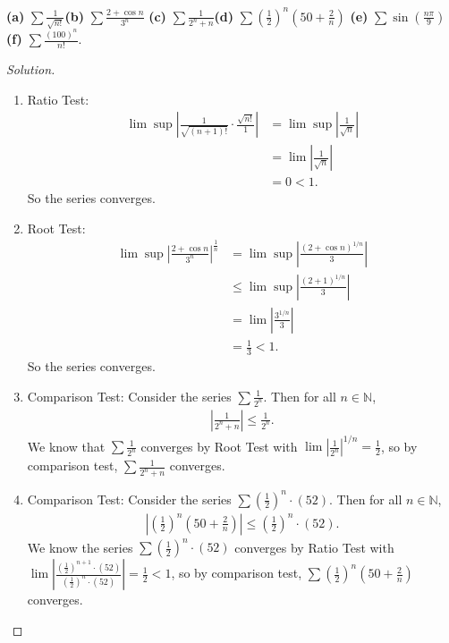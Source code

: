 \documentclass{article}
\begin{document}
\noindent \textbf{(a)} $\sum\frac{1}{\sqrt{n!}}$\quad \textbf{(b)} $\sum\frac{2+\cos n}{3^n}$
\quad \textbf{(c)} $\sum\frac{1}{2^n+n}$\quad \textbf{(d)} $\sum\left(\frac{1}{2}\right)^n
\left(50+\frac{2}{n}\right)$ \quad \textbf{(e)} $\sum\sin \left(\frac{n\pi}{9}\right)$ 
\quad \textbf{(f)} $\sum\frac{(100)^n}{n!}$.
\begin{proof}[Solution]\indent
    \begin{enumerate}[label=(\alph*)]
        \item Ratio Test:
        \begin{align*}
            \lim\sup\left|\frac{1}{\sqrt{(n+1)!}}\cdot\frac{\sqrt{n!}}{1}\right| & = \lim\sup\left|\frac{1}{\sqrt{n}}\right| \\
            & = \lim\left|\frac{1}{\sqrt{n}}\right| \\
            & = 0 < 1.
        \end{align*}
        So the series converges.

        \item Root Test:
        \begin{align*}
            \lim\sup\left|\frac{2+\cos n}{3^n}\right|^{\frac{1}{n}} & = \lim\sup\left|\frac{(2+\cos n)^{1/n}}{3}\right| \\
            & \le \lim\sup \left|\frac{(2+1)^{1/n}}{3}\right| \\
            & = \lim \left|\frac{3^{1/n}}{3}\right| \\
            & = \frac{1}{3} < 1.
        \end{align*}
        So the series converges.

        \item Comparison Test:
        Consider the series $\sum\frac{1}{2^n}$. Then for all $n\in\mathbb{N}$,
        \begin{align*}
            \left|\frac{1}{2^n+n}\right| \le \frac{1}{2^n}.
        \end{align*}
        We know that $\sum\frac{1}{2^n}$ converges by Root Test with 
        $\lim \left|\frac{1}{2^n}\right|^{1/n}=\frac{1}{2}$, so by comparison test, 
        $\sum\frac{1}{2^n+n}$ converges.

        \item Comparison Test:
        Consider the series $\sum\left(\frac{1}{2}\right)^n\cdot(52)$. Then for all $n\in\mathbb{N}$,
        \begin{align*}
            \left|\left(\frac{1}{2}\right)^n\left(50+\frac{2}{n}\right)\right| \le \left(\frac{1}{2}\right)^n\cdot(52).
        \end{align*}
        We know the series $\sum\left(\frac{1}{2}\right)^n\cdot(52)$ converges by Ratio Test with 
        $\lim\left|\frac{\left(\frac{1}{2}\right)^{n+1}\cdot(52)}{\left(\frac{1}{2}\right)^n\cdot(52)}\right|=\frac{1}{2}<1$,
        so by comparison test, $\sum\left(\frac{1}{2}\right)^n\left(50+\frac{2}{n}\right)$ converges.
    

\end{enumerate}
\end{proof}
\end{document}
